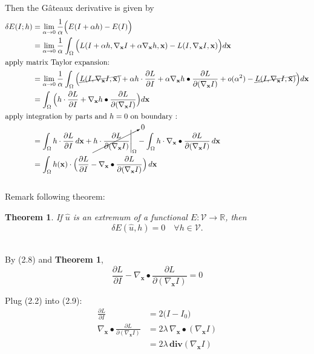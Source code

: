 \documentclass[paper=a4, fontsize=11pt]{scrartcl} %
\numberwithin{equation}{section} %
\numberwithin{figure}{section} %
\numberwithin{table}{section} %
\renewcommand{\vec}[1]{\mathbf{#1}}
\newtheorem{theorem}{Theorem}
\begin{document}
Then the G\^ateaux derivative is given by 
\begin{align}
	\delta E(I;h) &= \lim_{\alpha \to 0} \frac{1}{\alpha}\Big(E(I + \alpha h) - E(I)\Big) \\
	&= \lim_{\alpha \to 0} \frac{1}{\alpha} \int_\Omega \Big(L(I + \alpha h, \nabla_{\vec{x}} I + \alpha \nabla_{\vec{x}} h, \vec{x}) - L(I, \nabla_{\vec{x}} I, \vec{x}) \Big) d\vec{x} \\ 
	\shortintertext{apply matrix Taylor expansion:} 
	&= \lim_{\alpha \to 0} \frac{1}{\alpha} \int_\Omega \Big( \cancel{L(I, \nabla_{\vec{x}} I, \vec{x})} + \alpha h \cdot \frac{\partial L}{\partial I} + \alpha \nabla_{\vec{x}} h \bullet \frac{\partial L}{\partial (\nabla_{\vec{x}} I)} + o(\alpha^2) - \cancel{L(I, \nabla_{\vec{x}} I, \vec{x})} \Big) d\vec{x} \\
	&= \int_\Omega \Big( h \cdot \frac{\partial L}{\partial I} + \nabla_{\vec{x}} h \bullet \frac{\partial L}{\partial (\nabla_{\vec{x}} I)} \Big) d\vec{x} \\
	\shortintertext{apply integration by parts and $h = 0$ on boundary :} 
	&= \int_\Omega h \cdot \frac{\partial L}{\partial I} \, d\vec{x} + \cancelto{0}{h \cdot \frac{\partial L}{\partial (\nabla_{\vec{x}} I)} \Bigg|_\Omega}  - \int_\Omega h \cdot \nabla_{\vec{x}} \bullet \frac{\partial L}{\partial (\nabla_{\vec{x}} I)} \, d\vec{x} \\
	&= \int_\Omega h(\vec{x}) \cdot \Big( \frac{\partial L}{\partial I} - \nabla_{\vec{x}} \bullet \frac{\partial L}{\partial (\nabla_{\vec{x}} I)} \Big) \, d\vec{x}
\end{align} \\

Remark following theorem:

\begin{theorem}
	If $\hat{u}$ is an extremum of a functional $E : \mathcal{V} \rightarrow \mathbb{R}$, then \\
	\begin{equation*}
		\delta E(\hat{u}, h) = 0 \quad \forall h \in \mathcal{V}.
	\end{equation*} \\
\end{theorem}

By (2.8) and \textbf{Theorem 1}, 
\begin{equation}
	\frac{\partial L}{\partial I} - \nabla_{\vec{x}} \bullet \frac{\partial L}{\partial (\nabla_{\vec{x}} I)} = 0	
\end{equation}


Plug (2.2) into (2.9): 
\begin{align}
	\frac{\partial L}{\partial I} &= 2 \big(I - I_0) \\
	\nabla_{\vec{x}} \bullet \frac{\partial L}{\partial (\nabla_{\vec{x}} I)} &= 2 \lambda \, \nabla_{\vec{x}} \bullet (\nabla_{\vec{x}} I) \\ 
	&= 2 \lambda \, \textbf{div}(\nabla_{\vec{x}} I)
\end{align}
\end{document}
